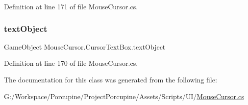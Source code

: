 Definition at line 171 of file Mouse\+Cursor.\+cs.

\mbox{\label{class_mouse_cursor_1_1_cursor_text_box_a283319b6e5e40cebf12f5a901c58466e}} 
\subsubsection{\texorpdfstring{text\+Object}{textObject}}
{\footnotesize\ttfamily Game\+Object Mouse\+Cursor.\+Cursor\+Text\+Box.\+text\+Object}



Definition at line 170 of file Mouse\+Cursor.\+cs.



The documentation for this class was generated from the following file\+:\begin{DoxyCompactItemize}
\item 
G\+:/\+Workspace/\+Porcupine/\+Project\+Porcupine/\+Assets/\+Scripts/\+U\+I/\hyperlink{_mouse_cursor_8cs}{Mouse\+Cursor.\+cs}\end{DoxyCompactItemize}

